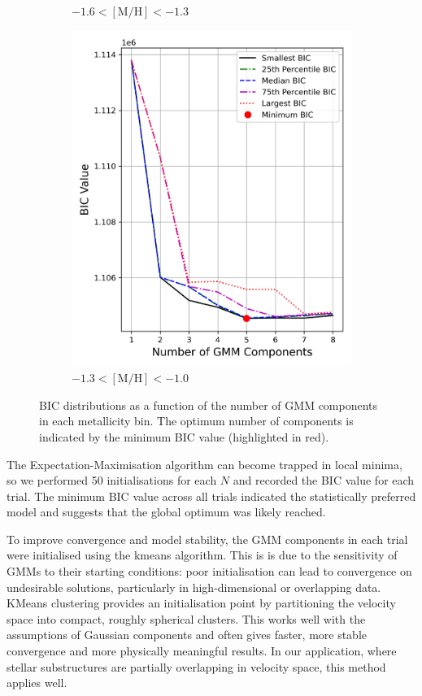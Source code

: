 \documentclass[a4paper,12pt]{article}
\begin{document}
\begin{figure}[h]
\begin{subfigure}[t]{0.23\textwidth}
        \caption{$-1.6 < \mathrm{[M/H]} < -1.3$}
    \end{subfigure}
    \hfill
    \begin{subfigure}[t]{0.23\textwidth}
        \centering
        \includegraphics[width=\linewidth]{../figures/bic_mp2.png}
        \caption{$-1.3 < \mathrm{[M/H]} < -1.0$}
    \end{subfigure}

    \caption{BIC distributions as a function of the number of GMM components in each metallicity bin. The optimum number of components is indicated by the minimum BIC value (highlighted in red).}
    \label{fig:bic_vs_n_components}
\end{figure}


The Expectation-Maximisation algorithm can become trapped in local minima, so we performed 50 initialisations 
for each $N$ and recorded the BIC value for each trial. The minimum BIC value across all trials indicated 
the statistically preferred model and suggests that the global optimum was likely reached. 

To improve convergence and model stability, the GMM components in each trial were initialised using the kmeans algorithm. 
This is is due to the sensitivity of GMMs to their starting conditions: poor initialisation can lead to convergence 
on undesirable solutions, particularly in high-dimensional or overlapping data. KMeans clustering provides an
initialisation point by partitioning the velocity space into compact, roughly spherical clusters. This works well with the 
assumptions of Gaussian components and often gives faster, more stable convergence and more physically meaningful results. 
In our application, where stellar substructures are partially overlapping in velocity space, this method applies well.
\end{document}
